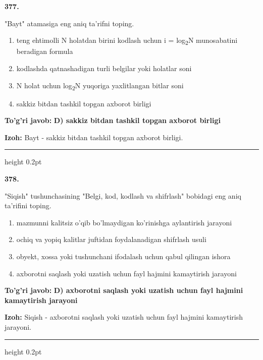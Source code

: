 \documentclass[10pt,a4paper,oneside]{article}
\begin{document}
\noindent\textbf{\color{ink}377.}
\par
"Bayt" atamasiga eng aniq ta'rifni toping.
\begin{enumerate}[label=\Alph*),leftmargin=9mm]
\item teng ehtimolli N holatdan birini kodlash uchun i = log\textsubscript{2}N munosabatini beradigan formula
\item kodlashda qatnashadigan turli belgilar yoki holatlar soni
\item N holat uchun log\textsubscript{2}N yuqoriga yaxlitlangan bitlar soni
\item sakkiz bitdan tashkil topgan axborot birligi
\end{enumerate}
\begin{tcolorbox}[enhanced,breakable,colback=teal!4,colframe=teal!50!black,boxrule=0.5pt,arc=1.1mm,left=3mm,right=3mm,top=1.7mm,bottom=1.7mm,before skip=2mm,after skip=2mm]
\textbf{\color{teal}To'g'ri javob:} \textbf{D) sakkiz bitdan tashkil topgan axborot birligi}
\par\smallskip
\textbf{Izoh:} Bayt - sakkiz bitdan tashkil topgan axborot birligi.
\end{tcolorbox}
\vspace{2mm}\hrule height 0.2pt \vspace{3mm}

\noindent\textbf{\color{ink}378.}
\par
"Siqish" tushunchasining "Belgi, kod, kodlash va shifrlash" bobidagi eng aniq ta'rifini toping.
\begin{enumerate}[label=\Alph*),leftmargin=9mm]
\item mazmunni kalitsiz o'qib bo'lmaydigan ko'rinishga aylantirish jarayoni
\item ochiq va yopiq kalitlar juftidan foydalanadigan shifrlash usuli
\item obyekt, xossa yoki tushunchani ifodalash uchun qabul qilingan ishora
\item axborotni saqlash yoki uzatish uchun fayl hajmini kamaytirish jarayoni
\end{enumerate}
\begin{tcolorbox}[enhanced,breakable,colback=teal!4,colframe=teal!50!black,boxrule=0.5pt,arc=1.1mm,left=3mm,right=3mm,top=1.7mm,bottom=1.7mm,before skip=2mm,after skip=2mm]
\textbf{\color{teal}To'g'ri javob:} \textbf{D) axborotni saqlash yoki uzatish uchun fayl hajmini kamaytirish jarayoni}
\par\smallskip
\textbf{Izoh:} Siqish - axborotni saqlash yoki uzatish uchun fayl hajmini kamaytirish jarayoni.
\end{tcolorbox}
\vspace{2mm}\hrule height 0.2pt \vspace{3mm}
\end{document}
